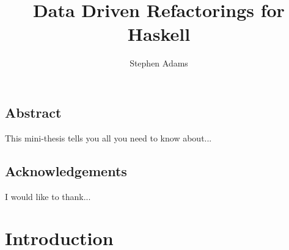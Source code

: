 

\usepackage{hyperref}

\usepackage{makeidx}



\setcounter{secnumdepth}{3} %

\def\fixme#1{\fbox{\textbf{\textsc{Fixme}}\quad#1}}
\def\fixpic#1{\fbox{\textbf{\textsc{Picture}}\quad#1}}
\def\defnx#1#2{\emph{#1}\index{#2}}
\def\defn#1{\defnx{#1}{#1}}
\def\floatpic#1#2{%
\begin{figure}
\texttt{[image: \#2]}
\end{figure}}
\def\inlinepic#1#2{%
\begin{center}
\texttt{[image: \#2]}
\end{center}}




\title{Data Driven Refactorings for Haskell}
\author{Stephen Adams}
\subject{Computer Science}

\begin{preface}
\section{Abstract}
This mini-thesis tells you all you need to know about...
\section{Acknowledgements}
I would like to thank...
\end{preface}

\chapter{Introduction}\label{chp:intro}


